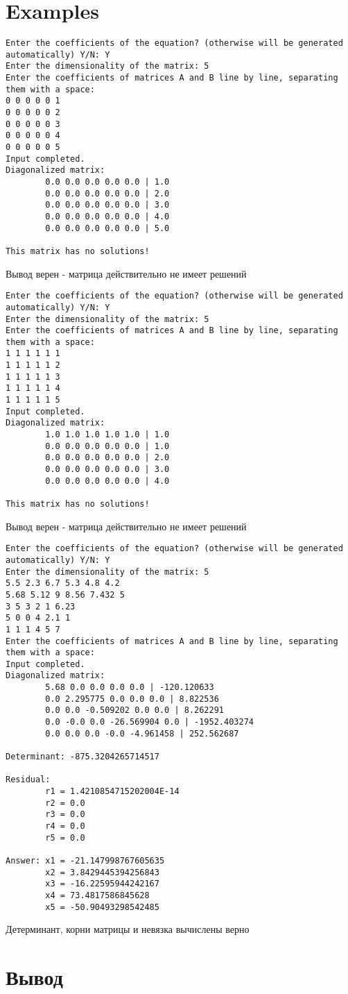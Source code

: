 \section{Examples}
\tiny
\begin{verbatim}
Enter the coefficients of the equation? (otherwise will be generated automatically) Y/N: Y
Enter the dimensionality of the matrix: 5
Enter the coefficients of matrices A and B line by line, separating them with a space:
0 0 0 0 0 1
0 0 0 0 0 2
0 0 0 0 0 3
0 0 0 0 0 4
0 0 0 0 0 5
Input completed.
Diagonalized matrix:
		0.0 0.0 0.0 0.0 0.0 | 1.0
		0.0 0.0 0.0 0.0 0.0 | 2.0
		0.0 0.0 0.0 0.0 0.0 | 3.0
		0.0 0.0 0.0 0.0 0.0 | 4.0
		0.0 0.0 0.0 0.0 0.0 | 5.0

This matrix has no solutions!
\end{verbatim}
\normalsize
Вывод верен - матрица действительно не имеет решений\\
\tiny
\begin{verbatim}
Enter the coefficients of the equation? (otherwise will be generated automatically) Y/N: Y
Enter the dimensionality of the matrix: 5
Enter the coefficients of matrices A and B line by line, separating them with a space:
1 1 1 1 1 1
1 1 1 1 1 2
1 1 1 1 1 3
1 1 1 1 1 4
1 1 1 1 1 5
Input completed.
Diagonalized matrix:
		1.0 1.0 1.0 1.0 1.0 | 1.0
		0.0 0.0 0.0 0.0 0.0 | 1.0
		0.0 0.0 0.0 0.0 0.0 | 2.0
		0.0 0.0 0.0 0.0 0.0 | 3.0
		0.0 0.0 0.0 0.0 0.0 | 4.0

This matrix has no solutions!
\end{verbatim}
\normalsize
Вывод верен - матрица действительно не имеет решений\\
\tiny
\begin{verbatim}
Enter the coefficients of the equation? (otherwise will be generated automatically) Y/N: Y
Enter the dimensionality of the matrix: 5
5.5 2.3 6.7 5.3 4.8 4.2
5.68 5.12 9 8.56 7.432 5
3 5 3 2 1 6.23
5 0 0 4 2.1 1
1 1 1 4 5 7
Enter the coefficients of matrices A and B line by line, separating them with a space:
Input completed.
Diagonalized matrix:
		5.68 0.0 0.0 0.0 0.0 | -120.120633
		0.0 2.295775 0.0 0.0 0.0 | 8.822536
		0.0 0.0 -0.509202 0.0 0.0 | 8.262291
		0.0 -0.0 0.0 -26.569904 0.0 | -1952.403274
		0.0 0.0 0.0 -0.0 -4.961458 | 252.562687

Determinant: -875.3204265714517

Residual:
		r1 = 1.4210854715202004E-14
		r2 = 0.0
		r3 = 0.0
		r4 = 0.0
		r5 = 0.0

Answer: x1 = -21.147998767605635
		x2 = 3.8429445394256843
		x3 = -16.22595944242167
		x4 = 73.4817586845628
		x5 = -50.90493298542485
\end{verbatim}
\normalsize
Детерминант, корни матрицы и невязка вычислены верно\\
\newpage
\thispagestyle{empty}
\BgThispage
\section{Вывод}